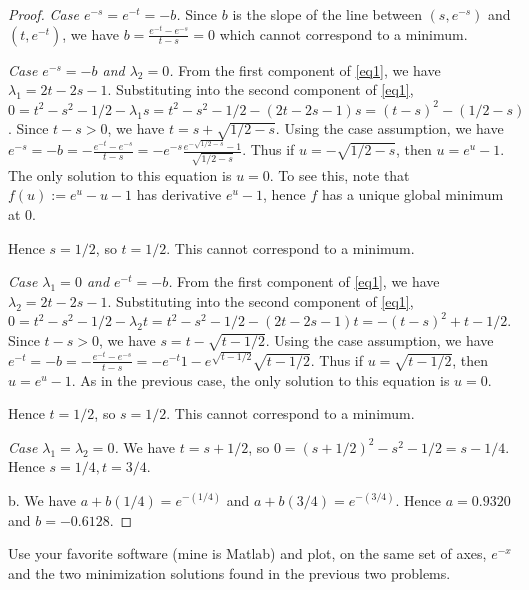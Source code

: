 \documentclass{article}
\begin{document}
\begin{proof}
\emph{Case $e^{-s} = e^{-t} = -b$.} Since $b$ is the slope of the line between $(s, e^{-s})$ and $(t, e^{-t})$, we have $b = \frac {e^{-t} - e^{-s}}{t - s} = 0$ which cannot correspond to a minimum.

\emph{Case $e^{-s} = -b$ and $\lambda_2 = 0$.} From the first component of \ref{eq1}, we have
$\lambda_1 = 2t - 2s -1$. Substituting into the second component of \ref{eq1}, 
$0 = t^2 - s^2 - 1/2  - \lambda_1 s = t^2 - s^2 - 1/2 - (2t - 2s -1)s = (t - s)^2 - (1/2 -s)$. Since $t - s > 0$, we have 
$t = s + \sqrt{1/2 -s}$.
Using the case assumption, we have $e^{-s} = -b = -\frac{e^{-t} - e^{-s}}{t-s} = - e^{-s} \frac {e^{-\sqrt{1/2 - s}} -1} {\sqrt{1/2 - s}}$. Thus if $u = -\sqrt{1/2 - s}$,
then $u = e^u -1$.  The only solution to this equation is $u = 0$. To see this, note that $f(u) := e^u - u - 1$ has derivative $e^u -1$, hence $f$ has a unique global minimum at $0$.

Hence $s = 1/2$, so $t = 1/2$. This cannot correspond to a minimum.

\emph{Case $\lambda_1 = 0$ and $e^{-t} = -b$.} From the first component of \ref{eq1}, we have
$\lambda_2 = 2t - 2s -1$. Substituting into the second component of \ref{eq1}, 
$0 = t^2 - s^2 - 1/2  - \lambda_2 t = t^2 - s^2 - 1/2 - (2t - 2s -1)t = -(t - s)^2 + t - 1/2$. Since $t -s > 0$, we have $s = t - \sqrt{t - 1/2}$.
Using the case assumption, we have $e^{-t} = -b = -\frac{e^{-t} - e^{-s}}{t-s} = -e^{-t} {1 - e^{\sqrt{t- 1/2 }}} {\sqrt{t - 1/2}}$. Thus if $u = \sqrt{t - 1/2}$,
then $u = e^u - 1$.  As in the previous case, the only solution to this equation is $u = 0$. 

Hence $t = 1/2$, so $s = 1/2$. This cannot correspond to a minimum.

\emph{Case $\lambda_1 = \lambda_2 = 0$.} We have $t = s + 1/2$, so $0 = (s + 1/2)^2 - s^2 -1/2 = s - 1/4$. Hence $s = 1/4, t = 3/4$.

b. We have $a + b(1/4) = e^{-(1/4)}$ and $a + b(3/4) = e^{-(3/4)}$.  Hence $a = 0.9320$ and $b = -0.6128$.

\end{proof}

 Use your favorite software (mine is Matlab) and plot, on the same set of axes, $e^{-x}$ and the two minimization solutions found in the previous two problems.

\end{document}
